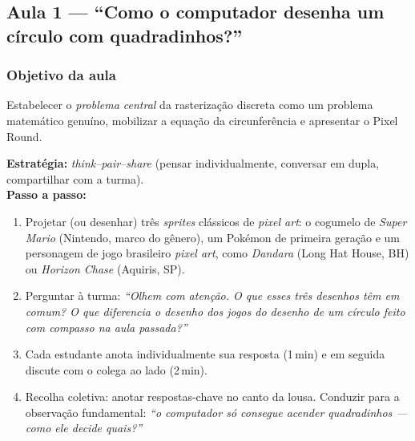 \documentclass[12pt,a4paper]{scrartcl}
\newcommand{\tempo}[1]{\textnormal{\footnotesize\color{bg!90!white}\textsf{#1}}}
\begin{document}
\subsection{Aula 1 --- ``Como o computador desenha um círculo com quadradinhos?''}\label{aula1}

\subsubsection*{Objetivo da aula}
Estabelecer o \emph{problema central} da rasterização discreta como um problema matemático genuíno, mobilizar a equação da circunferência e apresentar o Pixel Round.

\begin{atividade}[1.1 --- Mobilização \quad\tempo{10 min}]
\textbf{Estratégia:} \emph{think--pair--share} (pensar individualmente, conversar em dupla, compartilhar com a turma). \\[0.4em]
\textbf{Passo a passo:}
\begin{enumerate}[leftmargin=1.5em,itemsep=0.2em,topsep=0.3em,nosep]
  \item Projetar (ou desenhar) três \emph{sprites} clássicos de \emph{pixel art}: o cogumelo de \emph{Super Mario} (Nintendo, marco do gênero), um Pokémon de primeira geração e um personagem de jogo brasileiro \emph{pixel art}, como \emph{Dandara} (Long Hat House, BH) ou \emph{Horizon Chase} (Aquiris, SP).
  \item Perguntar à turma: \emph{``Olhem com atenção. O que esses três desenhos têm em comum? O que diferencia o desenho dos jogos do desenho de um círculo feito com compasso na aula passada?''}
  \item Cada estudante anota individualmente sua resposta (1\,min) e em seguida discute com o colega ao lado (2\,min).
  \item Recolha coletiva: anotar respostas-chave no canto da lousa. Conduzir para a observação fundamental: \emph{``o computador só consegue acender quadradinhos --- como ele decide quais?''}
\end{enumerate}
\end{atividade}
\end{document}
